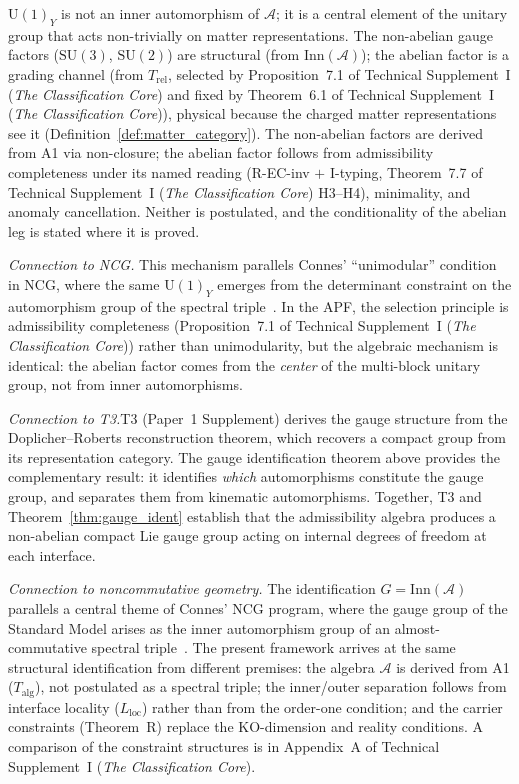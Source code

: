 \documentclass[11pt]{article}
\theoremstyle{definition}
\newcommand{\SU}{\mathrm{SU}}
\newcommand{\U}{\mathrm{U}}
\newcommand{\TSI}{Technical Supplement~I (\emph{The Classification Core})}
\begin{document}
$\U(1)_Y$ is not an inner automorphism of $\mathcal{A}$; it is a
central element of the unitary group that acts non-trivially on matter
representations.  The non-abelian gauge factors ($\SU(3)$, $\SU(2)$)
are structural (from $\mathrm{Inn}(\mathcal{A})$); the abelian factor
is a grading channel (from $T_{\mathrm{rel}}$,
selected by Proposition~7.1 of \TSI{} and fixed by
Theorem~6.1 of \TSI{}), physical because the charged matter
representations see it (Definition~\ref{def:matter_category}).
The non-abelian factors are derived from A1 via non-closure; the
abelian factor follows from admissibility completeness under its
named reading (R-EC-inv $+$ I-typing,
Theorem~7.7 of \TSI{} H3--H4), minimality, and
anomaly cancellation.  Neither is postulated, and the conditionality
of the abelian leg is stated where it is proved.

\smallskip\noindent\textit{Connection to NCG.}\quad
This mechanism parallels Connes' ``unimodular'' condition in NCG, where
the same $\U(1)_Y$ emerges from the determinant constraint on the
automorphism group of the spectral triple~\cite{Connes1996}.  In the APF,
the selection principle is admissibility completeness
(Proposition~7.1 of \TSI{}) rather than unimodularity, but the
algebraic mechanism is identical: the abelian factor comes from the
\emph{center} of the multi-block unitary group, not from inner
automorphisms.

\noindent\textit{Connection to T3.}\quad T3 (Paper~1 Supplement) derives
the gauge structure from the Doplicher--Roberts reconstruction theorem,
which recovers a compact group from its representation category.  The
gauge identification theorem above provides the complementary result:
it identifies \emph{which} automorphisms constitute the gauge group,
and separates them from kinematic automorphisms.  Together, T3 and
Theorem~\ref{thm:gauge_ident} establish that the admissibility algebra
produces a non-abelian compact Lie gauge group acting on internal
degrees of freedom at each interface.

\smallskip\noindent\textit{Connection to noncommutative geometry.}\quad
The identification $G = \mathrm{Inn}(\mathcal{A})$ parallels a central
theme of Connes' NCG program, where the gauge group of the Standard
Model arises as the inner automorphism group of an almost-commutative
spectral triple~\cite{Connes1996}.  The present framework arrives at
the same structural identification from different premises: the algebra
$\mathcal{A}$ is derived from A1 ($T_{\mathrm{alg}}$), not postulated
as a spectral triple; the inner/outer separation follows from interface
locality ($L_{\mathrm{loc}}$) rather than from the order-one condition;
and the carrier constraints (Theorem~R) replace the KO-dimension and
reality conditions.  A comparison of the constraint structures is in
Appendix~A of \TSI{}.
\end{document}
